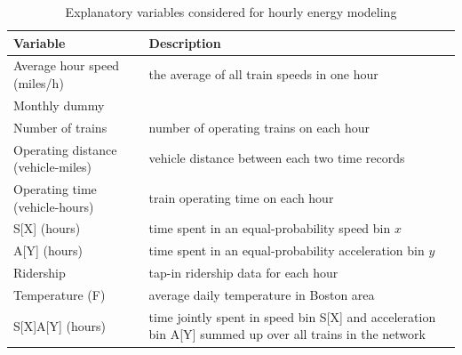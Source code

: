 \documentclass[times]{TRR}
\begin{document}
\begin{table}[ht!]\small
    \centering
    \caption{Explanatory variables considered for hourly energy modeling}
    \label{tab:variablesset}
    \begin{tabular}{l p{4in}}\toprule \rowcolors{1}{gray!25}{white}
        \bf Variable & \bf Description \\\midrule
       Average hour speed (miles/h) & the average of all train speeds in one hour\\
       Monthly dummy & \\
       Number of trains & number of operating trains on each hour\\       
       Operating distance (vehicle-miles) & vehicle distance between each two time records\\
       Operating time (vehicle-hours) & train operating time on each hour\\
       S[X] (hours) & time spent in an equal-probability speed bin $x$ \\
       A[Y] (hours) & time spent in an equal-probability acceleration bin $y$ \\
       Ridership & tap-in ridership data for each hour\\
       Temperature (F) & average daily temperature in Boston area\\
       S[X]A[Y] (hours) & time jointly spent in speed bin S[X] and acceleration bin A[Y] summed up over all trains in the network\\
       \bottomrule
    \end{tabular}
\end{table}
\end{document}
